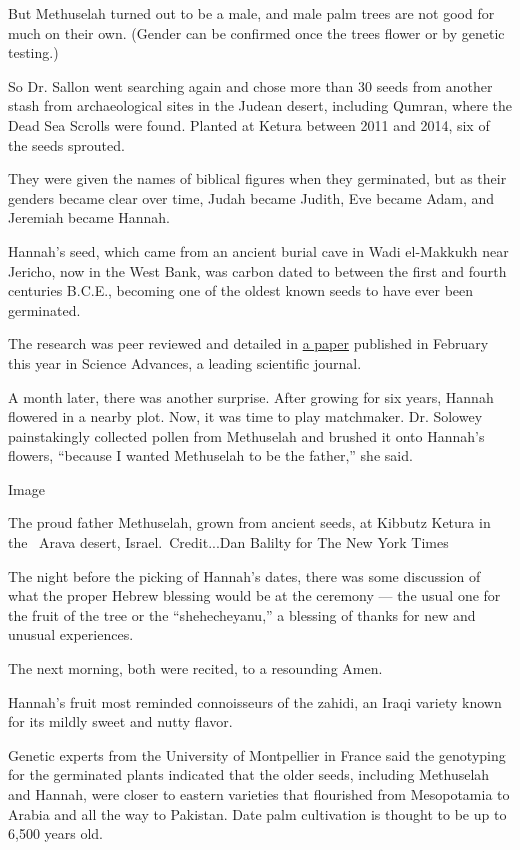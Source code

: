 But Methuselah turned out to be a male, and male palm trees are not good
for much on their own. (Gender can be confirmed once the trees flower or
by genetic testing.)

So Dr. Sallon went searching again and chose more than 30 seeds from
another stash from archaeological sites in the Judean desert, including
Qumran, where the Dead Sea Scrolls were found. Planted at Ketura between
2011 and 2014, six of the seeds sprouted.

They were given the names of biblical figures when they germinated, but
as their genders became clear over time, Judah became Judith, Eve became
Adam, and Jeremiah became Hannah.

Hannah's seed, which came from an ancient burial cave in Wadi el-Makkukh
near Jericho, now in the West Bank, was carbon dated to between the
first and fourth centuries B.C.E., becoming one of the oldest known
seeds to have ever been germinated.

The research was peer reviewed and detailed in
\href{https://advances.sciencemag.org/content/6/6/eaax0384}{a paper}
published in February this year in Science Advances, a leading
scientific journal.

A month later, there was another surprise. After growing for six years,
Hannah flowered in a nearby plot. Now, it was time to play matchmaker.
Dr. Solowey painstakingly collected pollen from Methuselah and brushed
it onto Hannah's flowers, ``because I wanted Methuselah to be the
father,'' she said.

Image

The proud father Methuselah, grown from ancient seeds, at Kibbutz Ketura
in the~ Arava desert, Israel.~Credit...Dan Balilty for The New York
Times

The night before the picking of Hannah's dates, there was some
discussion of what the proper Hebrew blessing would be at the ceremony
--- the usual one for the fruit of the tree or the ``shehecheyanu,'' a
blessing of thanks for new and unusual experiences.

The next morning, both were recited, to a resounding Amen.

Hannah's fruit most reminded connoisseurs of the zahidi, an Iraqi
variety known for its mildly sweet and nutty flavor.

Genetic experts from the University of Montpellier in France said the
genotyping for the germinated plants indicated that the older seeds,
including Methuselah and Hannah, were closer to eastern varieties that
flourished from Mesopotamia to Arabia and all the way to Pakistan. Date
palm cultivation is thought to be up to 6,500 years old.


